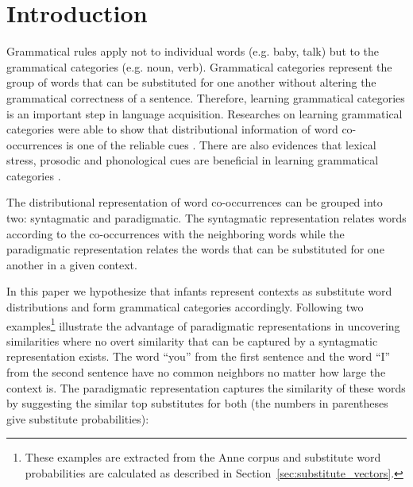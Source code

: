 \section{Introduction}
\label{sec:introduction}
Grammatical rules apply not to individual words (e.g. baby, talk) but to the
grammatical categories (e.g. noun, verb).  Grammatical categories represent the
group of words that can be substituted for one another without altering the
grammatical correctness of a sentence.  Therefore, learning grammatical
categories is an important step in language acquisition.  Researches on
learning grammatical categories were able to show that distributional
information of word co-occurrences is one of the reliable cues
\citep*{Mintz200391,clair2010,Redington98distributionalinformation}.  There are
also evidences that lexical stress, prosodic and phonological cues are
beneficial in learning grammatical categories
\citep*{monaghan2012integrating,saffran1996word,saffran1996word}. 

The distributional representation of word co-occurrences can be grouped into
two: syntagmatic and paradigmatic.  The syntagmatic representation relates
words according to the co-occurrences with the neighboring words while the
paradigmatic representation relates the words that can be substituted for one
another in a given context.

In this paper we hypothesize that infants represent contexts as substitute word
distributions and form grammatical categories accordingly.
Following two examples\footnote{These examples are extracted from the Anne
corpus and substitute word probabilities are calculated as described in
Section~\ref{sec:substitute_vectors}.} illustrate the advantage of paradigmatic
representations in uncovering similarities where no overt similarity that can
be captured by a syntagmatic representation exists. The word ``you'' from the
first sentence and the word ``I'' from the second sentence have no common
neighbors no matter how large the context is.  The paradigmatic representation
captures the similarity of these words by suggesting the similar top
substitutes for both (the numbers in parentheses give substitute
probabilities): 


